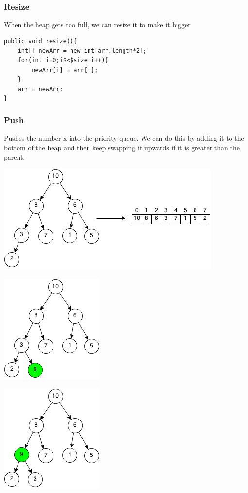 \documentclass[11pt,oneside]{book}
\makeatletter
\def\maxwidth#1{\ifdim\Gin@nat@width>#1 #1\else\Gin@nat@width\fi}
\makeatother
\begin{document}
\subsubsection{Resize}

When the heap gets too full, we can resize it to make it bigger

\begin{lstlisting}
public void resize(){
    int[] newArr = new int[arr.length*2];
    for(int i=0;i$<$size;i++){
        newArr[i] = arr[i];
    }
    arr = newArr;
}
\end{lstlisting}

\subsubsection{Push}

Pushes the number x into the priority queue. We can do this by adding it to the bottom of the heap and then keep swapping it upwards if it is greater than the parent.

\includegraphics[width=\maxwidth{\textwidth}]{maxheap.png}

\includegraphics[width=\maxwidth{\textwidth}]{maxheappush.png}

\includegraphics[width=\maxwidth{\textwidth}]{maxheappush2.png}
\end{document}
